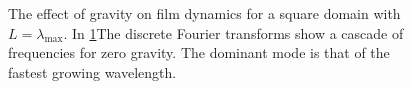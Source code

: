 \documentclass[a4paper,12pt]{article}
\begin{document}
  \begin{figure} 
   \centering
   \caption{The effect of gravity on film dynamics for a square domain with $L=\lambda_\text{max}$. In \ref{fig_ic_effect}The discrete Fourier transforms show a cascade of frequencies for zero gravity. The dominant mode is that of the fastest growing wavelength.}
   \label{fig_ic_effect}
  \end{figure}
\end{document}
